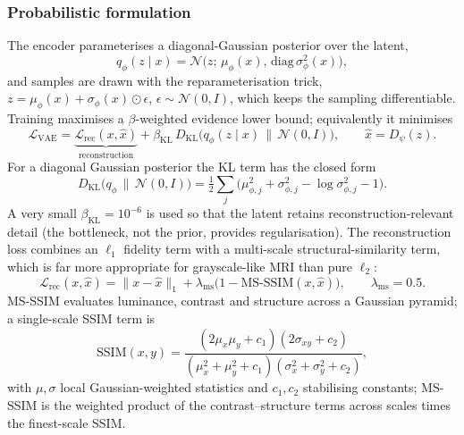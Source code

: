 \documentclass[12pt, a4paper]{article}
\begin{document}
\subsubsection{Probabilistic formulation}
The encoder parameterises a diagonal-Gaussian posterior over the latent,
\begin{equation}
    q_\phi(z\mid x) = \mathcal{N}\!\big(z;\, \mu_\phi(x),\, \mathrm{diag}\,\sigma_\phi^2(x)\big),
\end{equation}
and samples are drawn with the reparameterisation trick, $z = \mu_\phi(x) + \sigma_\phi(x)\odot\epsilon$, $\epsilon\sim\mathcal{N}(0,I)$, which keeps the sampling differentiable. Training maximises a $\beta$-weighted evidence lower bound; equivalently it minimises
\begin{equation}
    \mathcal{L}_{\text{VAE}}
    = \underbrace{\mathcal{L}_{\text{rec}}(x, \hat{x})}_{\text{reconstruction}}
    + \beta_{\text{KL}}\, D_{\mathrm{KL}}\!\big(q_\phi(z\mid x)\,\|\,\mathcal{N}(0,I)\big),
    \qquad \hat{x} = D_\psi(z).
\end{equation}
For a diagonal Gaussian posterior the KL term has the closed form
\begin{equation}
    D_{\mathrm{KL}}\!\big(q_\phi\,\|\,\mathcal{N}(0,I)\big)
    = \tfrac{1}{2}\sum_{j}\Big(\mu_{\phi,j}^2 + \sigma_{\phi,j}^2 - \log\sigma_{\phi,j}^2 - 1\Big).
\end{equation}
A very small $\beta_{\text{KL}}=10^{-6}$ is used so that the latent retains reconstruction-relevant detail (the bottleneck, not the prior, provides regularisation). The reconstruction loss combines an $\ell_1$ fidelity term with a multi-scale structural-similarity term, which is far more appropriate for grayscale-like MRI than pure $\ell_2$:
\begin{equation}
    \mathcal{L}_{\text{rec}}(x,\hat{x}) = \|x-\hat{x}\|_1 + \lambda_{\text{ms}}\big(1 - \mathrm{MS\text{-}SSIM}(x,\hat{x})\big), \qquad \lambda_{\text{ms}} = 0.5 .
\end{equation}
MS-SSIM \cite{wang2003msssim} evaluates luminance, contrast and structure across a Gaussian pyramid; a single-scale SSIM term is
\begin{equation}
    \mathrm{SSIM}(x,y) = \frac{(2\mu_x\mu_y + c_1)(2\sigma_{xy} + c_2)}{(\mu_x^2 + \mu_y^2 + c_1)(\sigma_x^2 + \sigma_y^2 + c_2)},
\end{equation}
with $\mu,\sigma$ local Gaussian-weighted statistics and $c_1,c_2$ stabilising constants; MS-SSIM is the weighted product of the contrast--structure terms across scales times the finest-scale SSIM.
\end{document}
